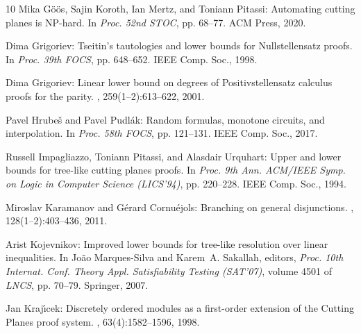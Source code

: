 \documentclass[11pt]{article}
\begin{document}
\begin{thebibliography}{10}
{\sc Mika G{\"{o}}{\"{o}}s, Sajin Koroth, Ian Mertz, and Toniann Pitassi}:
  Automating cutting planes is {NP}-hard.
\newblock In {\em Proc. 52nd STOC}, pp. 68--77. ACM Press, 2020.
\newblock [\epfmtdoi{10.1145/3357713.3384248}]

{\sc Dima Grigoriev}: Tseitin's tautologies and lower bounds for
  {N}ullstellensatz proofs.
\newblock In {\em Proc. 39th FOCS}, pp. 648--652. IEEE Comp. Soc., 1998.

{\sc Dima Grigoriev}: Linear lower bound on degrees of {P}ositivstellensatz
  calculus proofs for the parity.
, 259(1--2):613--622, 2001.
\newblock [\epfmtdoi{10.1016/S0304-3975(00)00157-2}]

{\sc Pavel Hrube{\v{s}} and Pavel Pudl{\'{a}}k}: Random formulas, monotone
  circuits, and interpolation.
\newblock In {\em Proc. 58th FOCS}, pp. 121--131. IEEE Comp. Soc., 2017.

{\sc Russell Impagliazzo, Toniann Pitassi, and Alasdair Urquhart}: Upper and
  lower bounds for tree-like cutting planes proofs.
\newblock In {\em Proc. 9th Ann. ACM/IEEE Symp. on Logic in Computer Science
  (LICS'94)}, pp. 220--228. IEEE Comp. Soc., 1994.

{\sc Miroslav Karamanov and G{\'{e}}rard Cornu{\'{e}}jols}: Branching on
  general disjunctions.
, 128(1--2):403--436, 2011.
\newblock [\epfmtdoi{10.1007/s10107-009-0332-3}]

{\sc Arist Kojevnikov}: Improved lower bounds for tree-like resolution over
  linear inequalities.
\newblock In {\sc Jo{\~{a}}o Marques{-}Silva and Karem~A. Sakallah}, editors,
  {\em Proc. 10th Internat. Conf. Theory Appl. Satisfiability Testing
  (SAT'07)}, volume 4501 of {\em LNCS}, pp. 70--79. Springer, 2007.
\newblock [\epfmtdoi{10.1007/978-3-540-72788-0\_10}]

{\sc Jan Kraj{\'{\i}}cek}: Discretely ordered modules as a first-order
  extension of the {Cutting} {Planes} proof system.
, 63(4):1582--1596, 1998.
\newblock [\epfmtdoi{10.2307/2586668}]


\end{thebibliography}
\end{document}
